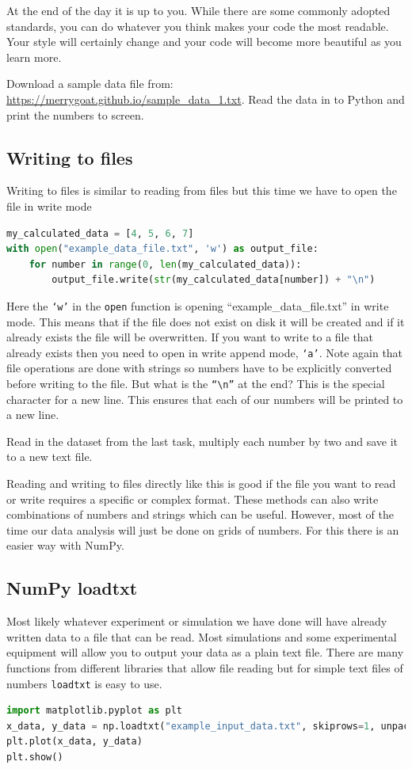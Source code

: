 At the end of the day it is up to you. While there are some commonly adopted standards, you can do whatever you think makes your code the most readable. Your style will certainly change and your code will become more beautiful as you learn more.

\begin{task}Download a sample data file from: \url{https://merrygoat.github.io/sample_data_1.txt}. Read the data in to Python and print the numbers to screen.\end{task}

	\subsection{Writing to files}
		Writing to files is similar to reading from files but this time we have to open the file in write mode
		\begin{lstlisting}[language=Python]
my_calculated_data = [4, 5, 6, 7]
with open("example_data_file.txt", 'w') as output_file:
	for number in range(0, len(my_calculated_data)):
		output_file.write(str(my_calculated_data[number]) + "\n")
\end{lstlisting}	
	Here the \texttt{`w'} in the \texttt{open} function is opening ``example\_data\_file.txt'' in write mode. This means that if the file does not exist on disk it will be created and if it already exists the file will be overwritten. If you want to write to a file that already exists then you need to open in write append mode, \texttt{`a'}.
Note again that file operations are done with strings so numbers have to be explicitly converted before writing to the file. But what is the \texttt{``\textbackslash{}n''} at the end? This is the special character for a new line. This ensures that each of our numbers will be printed to a new line.

\begin{task}Read in the dataset from the last task, multiply each number by two and save it to a new text file.\end{task}

Reading and writing to files directly like this is good if the file you want to read or write requires a specific or complex format. These methods can also write combinations of numbers and strings which can be useful. However, most of the time our data analysis will just be done on grids of numbers. For this there is an easier way with NumPy.

	\subsection{NumPy loadtxt}
		Most likely whatever experiment or simulation we have done will have already written data to a file that can be read. Most simulations and some experimental equipment will allow you to output your data as a plain text file. There are many functions from different libraries that allow file reading but for simple text files of numbers \texttt{loadtxt} is easy to use.
		\begin{lstlisting}[language=Python]
import matplotlib.pyplot as plt
x_data, y_data = np.loadtxt("example_input_data.txt", skiprows=1, unpack=True)
plt.plot(x_data, y_data)
plt.show()\end{lstlisting}

